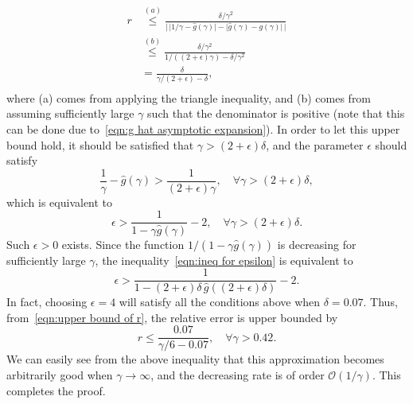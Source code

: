 \documentclass[journal,twocolumn]{IEEEtran}
\theoremstyle{nonumberplain}
\begin{document}
    \begin{equation}
        \begin{aligned}
        r & \overset{(a)}{\leq} \frac{\delta/\gamma^2}{\lvert \,\lvert 1/\gamma - \hat{g}(\gamma)\rvert - \lvert \hat{g}(\gamma) -  g(\gamma)\rvert\,\rvert} \\
        & \overset{(b)}{\leq} \frac{\delta/\gamma^2}{1/((2+\epsilon)\gamma) - \delta/\gamma^2} \\
        & = \frac{\delta}{\gamma/(2+\epsilon) - \delta}, \\
        \end{aligned}
        \label{eqn:upper bound of r}
    \end{equation}
    where (a) comes from applying the triangle inequality, and (b) comes from assuming sufficiently large $\gamma$ such that the denominator is positive (note that this can be done due to~\eqref{eqn:g hat asymptotic expansion}).
    In order to let this upper bound hold, it should be satisfied that $\gamma > (2+\epsilon)\delta$, and the parameter $\epsilon$ should satisfy 
    \begin{equation}
        \frac{1}{\gamma} - \hat{g}(\gamma) > \frac{1}{(2+\epsilon)\gamma}, \quad\forall \gamma > (2+\epsilon)\delta,
    \end{equation}
    which is equivalent to 
    \begin{equation}
        \epsilon > \frac{1}{1-\gamma \hat{g}(\gamma)}-2,\quad \forall \gamma > (2+\epsilon)\delta.
        \label{eqn:ineq for epsilon}
    \end{equation}
    Such $\epsilon>0$ exists. Since the function $ 1/(1-\gamma \hat{g}(\gamma))$ is decreasing for sufficiently large $\gamma$, the inequality~\eqref{eqn:ineq for epsilon} is equivalent to 
    \begin{equation}
        \epsilon > \frac{1}{1-(2+\epsilon)\delta\, \hat{g}((2+\epsilon)\delta)}-2.
    \end{equation}
    In fact, choosing $\epsilon=4$ will satisfy all the conditions above when $\delta = 0.07$. Thus, from~\eqref{eqn:upper bound of r}, the relative error is upper bounded by 
    \begin{equation}
        r \leq \frac{0.07}{\gamma/6 - 0.07},\quad \forall \gamma > 0.42.
    \end{equation}
    We can easily see from the above inequality that this approximation becomes arbitrarily good when $\gamma\to\infty$, and the decreasing rate is of order $\mathcal{O}(1/\gamma)$. This completes the proof. 
\end{document}

